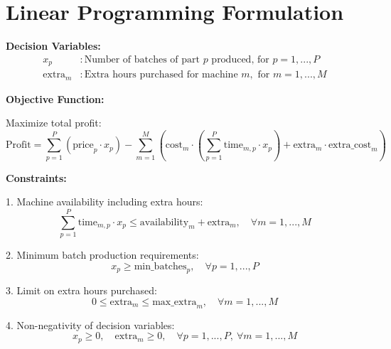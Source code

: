 \documentclass{article}
\begin{document}
\section*{Linear Programming Formulation}

\textbf{Decision Variables:}
\begin{align*}
x_p & : \text{Number of batches of part } p \text{ produced, for } p = 1, ..., P \\
\text{extra}_m & : \text{Extra hours purchased for machine } m, \text{ for } m = 1, ..., M
\end{align*}

\textbf{Objective Function:}

Maximize total profit:
\[
\text{Profit} = \sum_{p=1}^{P} \left( \text{price}_p \cdot x_p \right) - \sum_{m=1}^{M} \left( \text{cost}_m \cdot \left( \sum_{p=1}^{P} \text{time}_{m,p} \cdot x_p \right) + \text{extra}_m \cdot \text{extra\_cost}_m \right)
\]

\textbf{Constraints:}

1. Machine availability including extra hours:
\[
\sum_{p=1}^{P} \text{time}_{m,p} \cdot x_p \leq \text{availability}_m + \text{extra}_m, \quad \forall m = 1, ..., M
\]

2. Minimum batch production requirements:
\[
x_p \geq \text{min\_batches}_p, \quad \forall p = 1, ..., P
\]

3. Limit on extra hours purchased:
\[
0 \leq \text{extra}_m \leq \text{max\_extra}_m, \quad \forall m = 1, ..., M
\]

4. Non-negativity of decision variables:
\[
x_p \geq 0, \quad \text{extra}_m \geq 0, \quad \forall p = 1, ..., P, \ \forall m = 1, ..., M
\]
\end{document}
